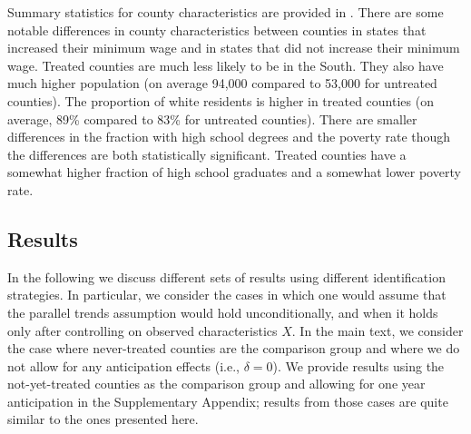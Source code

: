 \documentclass[11pt]{article}%
\theoremstyle{plain}
\numberwithin{sassumption}{section}
\numberwithin{equation}{section}
\begin{document}
Summary statistics for county characteristics are provided in .
There are some notable differences in county characteristics between counties
in states that increased their minimum wage and in states that did not
increase their minimum wage. Treated counties are much less likely to be in
the South. They also have much higher population (on average 94,000 compared
to 53,000 for untreated counties). The proportion of white residents is higher
in treated counties (on average, 89\% compared to 83\% for untreated
counties). There are smaller differences in the fraction with high school
degrees and the poverty rate though the differences are both statistically
significant. Treated counties have a somewhat higher fraction of high school
graduates and a somewhat lower poverty rate.

{ \singlespace
}

\subsection{Results}

In the following we discuss different sets of results using different
identification strategies. In particular, we consider the cases in which one
would assume that the parallel trends assumption would hold unconditionally,
and when it holds only after controlling on observed characteristics $X$.  In the main text, we consider the case where never-treated counties are the comparison group and where we do not allow for any anticipation effects (i.e., $\delta=0$).  We provide results using the not-yet-treated counties as the comparison group and allowing for one year anticipation in the Supplementary Appendix; results from those cases are quite similar to the ones presented here.
\end{document}

